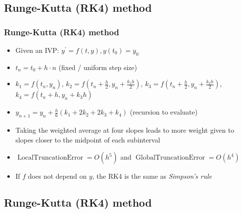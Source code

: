 \documentclass[usenames,svgnames,dvipsnames,10pt]{beamer}
\begin{document}
\subsection{Runge-Kutta (RK4) method}

\begin{frame}
\frametitle{Runge-Kutta (RK4) method}

\begin{itemize} 

\item Given an IVP: $y^{\prime} = f(t, y), y(t_0) = y_0$ 
\item $t_n = t_0 +h \cdot n$ (fixed / uniform step size)
\item $k_1 = f(t_n, y_n)$, $k_2 = f\left(t_n + \frac{h}{2}, y_n + \frac{k_1h}{2}\right)$, 
      $k_3 = f\left(t_n + \frac{h}{2}, y_n + \frac{k_2h}{2}\right)$, $k_4 = f\left(t_n + h, y_n + k_3h\right) $ 
\item $y_{n+1} = y_n + \frac{h}{6}\left(k_1 + 2k_2 + 2k_3 + k_4\right)$ (recursion to evaluate) 
\item Taking the weighted average at four slopes leads to more weight given to slopes closer to the midpoint 
      of each subinterval 
\item $\operatorname{LocalTruncationError} = O(h^5)$ and $\operatorname{GlobalTruncationError} = O(h^4)$ 
\item If $f$ does not depend on $y$, the RK4 is the same as \emph{Simpson's rule} 

\end{itemize} 

\end{frame}

\subsection{Runge-Kutta (RK4) method}
\end{document}
